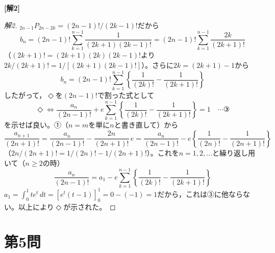 \documentclass[../main.tex]{subfiles}
\begin{document}
\bigskip
\noindent\textbf{[解2]}

\begin{proof}[解2]
  ${}_{2n-1}P_{2n-2k}=(2n-1)!/(2k-1)!$だから
  \[
    b_n=(2n-1)!\sum_{k=1}^{n-1}\frac1{(2k+1)(2k-1)!}=(2n-1)!\sum_{k=1}^{n-1}\frac{2k}{(2k+1)!}
  \]
  （$(2k+1)!=(2k+1)(2k)(2k-1)!$より$2k/(2k+1)!=1/[(2k+1)(2k-1)!]$）。さらに$2k=(2k+1)-1$から
  \[
    b_n=(2n-1)!\sum_{k=1}^{n-1}\left\{\frac1{(2k)!}-\frac1{(2k+1)!}\right\}
  \]
  したがって，$\Diamond$を$(2n-1)!$で割った式として
  \[
    \Diamond\iff\frac{a_n}{(2n-1)!}+e\sum_{k=1}^{n-1}\left\{\frac1{(2k)!}-\frac1{(2k+1)!}\right\}=1 \quad\cdots\text{③}
  \]
  を示せば良い。①（$n=m$を単に$n$と書き直して）から
  \[
    \frac{a_{n+1}}{(2n+1)!}=\frac{a_n}{(2n-1)!}-\frac{2n}{(2n+1)!}\,e=\frac{a_n}{(2n-1)!}-e\left\{\frac1{(2n)!}-\frac1{(2n+1)!}\right\}
  \]
  （$2n/(2n+1)!=1/(2n)!-1/(2n+1)!$）。これを$n=1,2,\dots$と繰り返し用いて（$n\ge2$の時）
  \[
    \frac{a_n}{(2n-1)!}=a_1-e\sum_{k=1}^{n-1}\left\{\frac1{(2k)!}-\frac1{(2k+1)!}\right\}
  \]
  $a_1=\displaystyle\int_0^1te^t\,dt=\left[e^t(t-1)\right]_0^1=0-(-1)=1$だから，これは③に他ならない。以上により$\Diamond$が示された。
\end{proof}

\newpage

\section*{第5問}
\end{document}

